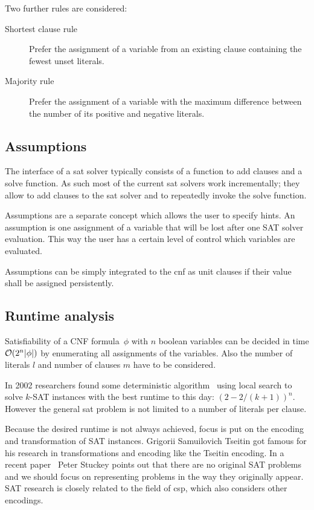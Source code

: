 Two further rules are considered:
\begin{description}
  \item[Shortest clause rule]
    Prefer the assignment of a variable from an existing clause containing the fewest unset literals.
  \item[Majority rule]
    Prefer the assignment of a variable with the maximum difference between the number of its positive and negative literals.
\end{description}

\subsection{Assumptions}
\label{sec:satsolvers-assumptions}
%
The interface of a \gls{sat} solver typically consists of a function to add clauses and a solve function. As such most of the current \gls{sat} solvers work incrementally; they allow to add clauses to the \gls{sat} solver and to repeatedly invoke the solve function.

Assumptions are a separate concept which allows the user to specify hints. An assumption is one assignment of a variable that will be lost after one SAT solver evaluation. This way the user has a certain level of control which variables are evaluated.

Assumptions can be simply integrated to the \gls{cnf} as unit clauses if their value shall be assigned persistently.

\subsection{Runtime analysis}
\label{sec:satsolvers-runtime}
%
Satisfiability of a CNF formula~$\phi$ with $n$ boolean variables can be decided in time $\mathcal{O}(2^n \lvert \phi\rvert)$ by enumerating all assignments of the variables. Also the number of literals $l$ and number of clauses $m$ have to be considered.

In 2002 researchers found some deterministic algorithm~\cite{Sat07} using local search to solve $k$-SAT instances with the best runtime to this day: $(2 - 2/(k+1))^n$. However the general \gls{sat} problem is not limited to a number of literals per clause.

Because the desired runtime is not always achieved, focus is put on the encoding and transformation of SAT instances. Grigorii Samuilovich Tseitin got famous for his research in transformations and encoding like the Tseitin encoding. In a recent paper~\cite{Sat22} Peter Stuckey points out that there are no original SAT problems and we should focus on representing problems in the way they originally appear. SAT research is closely related to the field of \gls{csp}, which also considers other encodings.

